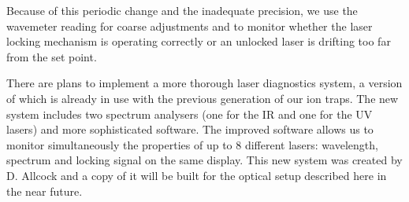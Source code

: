 Because of this periodic change and the inadequate precision, we use the wavemeter reading for coarse adjustments and to monitor whether the laser locking mechanism is operating correctly or an unlocked laser is drifting too far from the set point. 


There are plans to implement a more thorough laser diagnostics system, a version of which is already in use with the previous generation of our ion traps. The new system includes two spectrum analysers (one for the IR and one for the UV lasers) and more sophisticated software. The improved software allows us to monitor simultaneously the properties of up to 8 different lasers: wavelength, spectrum and locking signal on the same display. This new system was created by D. Allcock \cite{Allcock2006} and a copy of it will be built for the optical setup described here in the near future.



